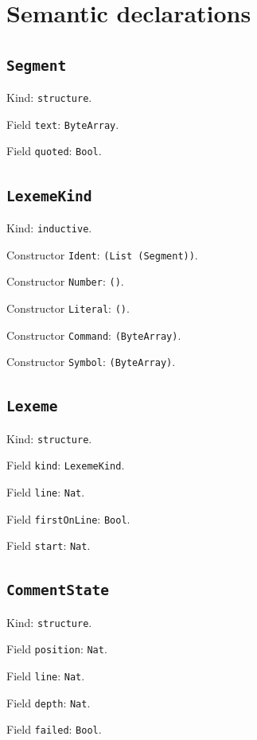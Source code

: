 \documentclass[11pt]{article}
\begin{document}
\section*{Semantic declarations}
\subsection*{\texttt{Segment}}
\noindent Kind: \texttt{structure}.\par
\noindent Field \texttt{text}: \texttt{ByteArray}.\par
\noindent Field \texttt{quoted}: \texttt{Bool}.\par
\subsection*{\texttt{LexemeKind}}
\noindent Kind: \texttt{inductive}.\par
\noindent Constructor \texttt{Ident}: \texttt{(List (Segment))}.\par
\noindent Constructor \texttt{Number}: \texttt{()}.\par
\noindent Constructor \texttt{Literal}: \texttt{()}.\par
\noindent Constructor \texttt{Command}: \texttt{(ByteArray)}.\par
\noindent Constructor \texttt{Symbol}: \texttt{(ByteArray)}.\par
\subsection*{\texttt{Lexeme}}
\noindent Kind: \texttt{structure}.\par
\noindent Field \texttt{kind}: \texttt{LexemeKind}.\par
\noindent Field \texttt{line}: \texttt{Nat}.\par
\noindent Field \texttt{firstOnLine}: \texttt{Bool}.\par
\noindent Field \texttt{start}: \texttt{Nat}.\par
\subsection*{\texttt{CommentState}}
\noindent Kind: \texttt{structure}.\par
\noindent Field \texttt{position}: \texttt{Nat}.\par
\noindent Field \texttt{line}: \texttt{Nat}.\par
\noindent Field \texttt{depth}: \texttt{Nat}.\par
\noindent Field \texttt{failed}: \texttt{Bool}.\par
\end{document}
